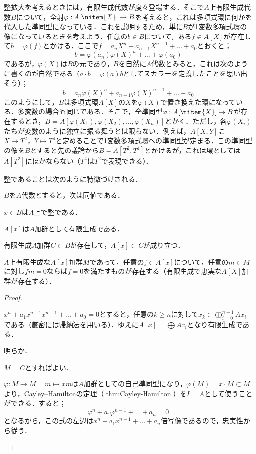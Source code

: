 整拡大を考えるときには，有限生成代数が度々登場する．そこで$A$上有限生成代数$B$について，全射$\varphi:A[\nitem{X}]\to B$を考えると，これは多項式環に何かを代入した準同型になっている．これを説明するため，単に$B$が1変数多項式環の像になっているときを考えよう．任意の$b\in B$について，ある$f\in A[X]$が存在して$b=\varphi(f)$とかける．ここで$f=a_nX^n+a_{n-1}X^{n-1}+\dots+a_0$とおくと；
\[b=\varphi(a_n)\varphi(X)^n+\dots+\varphi(a_0)\]
であるが，$\varphi(X)$は$B$の元であり，$B$を自然に$A$代数とみると，これは次のように書くのが自然である（$a\cdot b=\varphi(a)b$としてスカラーを定義したことを思い出そう）；
\[b=a_n\varphi(X)^n+a_{n-1}\varphi(X)^{n-1}+\dots+a_0\]
このようにして，$B$は多項式環$A[X]$の$X$を$\varphi(X)$で置き換えた環になっている．多変数の場合も同じである．そこで，全準同型$\varphi:A[\nitem{X}]\to B$が存在するとき，$B=A[\varphi(X_1),\varphi(X_2),\dots,\varphi(X_n)]$とかく．ただし，各$\varphi(X_i)$たちが変数のように独立に振る舞うとは限らない．例えば，$A[X,Y]$に$X\mapsto T^2，Y\mapsto T^4$と定めることで1変数多項式環への準同型が定まる．この準同型の像を$B$とすると先の議論から$B=A[T^2,T^4]$とかけるが，これは環としては$A[T^2]$にほかならない（$T^4$は$T^2$で表現できる）．

整であることは次のように特徴づけされる．
\begin{prop}\label{prop:整拡大の特徴づけ}
	$B$を$A$代数とすると，次は同値である．
	\begin{sakura}
		\item	$x\in B$は$A$上で整である．
		\item	$A[x]$は$A$加群として有限生成である．
		\item	有限生成$A$加群$C\subset B$が存在して，$A[x]\subset C$が成り立つ．
		\item	$A$上有限生成な$A[x]$加群$M$であって，任意の$f\in A[x]$について，任意の$m\in M$に対し$fm=0$ならば$f=0$を満たすものが存在する（有限生成で忠実な$A[X]$加群が存在する）．
	\end{sakura}
\end{prop}
\begin{proof}
	\begin{eqv}[4]
		\item $x^n+a_1x^{n-1}x^{n-1}+\dots+a_0=0$とすると，任意の$k\geq n$に対して$x_k\in \bigoplus_{i=0}^{n-1}Ax_i$である（厳密には帰納法を用いる）．ゆえに$A[x]=\bigoplus Ax_i$となり有限生成である．
		
		\item 明らか．
		\item $M=C$とすればよい．
		\item $\varphi:M\to M=m\mapsto xm$は$A$加群としての自己準同型になり，$\varphi(M)=x\cdot M\subset M$より，Cayley--Hamiltonの定理（\ref{thm:Cayley-Hamilton}）を$I=A$として使うことができる．すると；
		\[\varphi^n+a_1\varphi^{n-1}+\dots+a_n=0\]
		となるから，この式の左辺は$x^n+a_1x^{n-1}+\dots+a_n$倍写像であるので，忠実性から従う．
	\end{eqv}
\end{proof}

